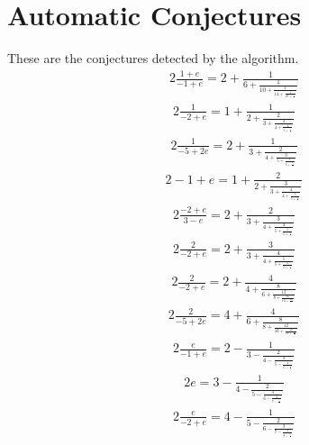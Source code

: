 \documentclass{article}%
\begin{document}
%
\normalsize%
\section{Automatic Conjectures}%
\label{sec:AutomaticConjectures}%
These are the conjectures detected by the algorithm.%
\begin{alignat*}{2}%
\frac{1 + e}{-1 + e} = 2 + \frac{1}{6 + \frac{1}{10 + \frac{1}{14 + \frac{1}{18 + \frac{1}{..}}}}}%
\end{alignat*}%
\begin{alignat*}{2}%
\frac{1}{-2 + e} = 1 + \frac{1}{2 + \frac{2}{3 + \frac{3}{4 + \frac{4}{5 + \frac{5}{..}}}}}%
\end{alignat*}%
\begin{alignat*}{2}%
\frac{1}{-5 + 2 e} = 2 + \frac{1}{3 + \frac{2}{4 + \frac{3}{5 + \frac{4}{6 + \frac{5}{..}}}}}%
\end{alignat*}%
\begin{alignat*}{2}%
-1 + e = 1 + \frac{2}{2 + \frac{3}{3 + \frac{4}{4 + \frac{5}{5 + \frac{6}{..}}}}}%
\end{alignat*}%
\begin{alignat*}{2}%
\frac{-2 + e}{3 - e} = 2 + \frac{2}{3 + \frac{3}{4 + \frac{4}{5 + \frac{5}{6 + \frac{6}{..}}}}}%
\end{alignat*}%
\begin{alignat*}{2}%
\frac{2}{-2 + e} = 2 + \frac{3}{3 + \frac{4}{4 + \frac{5}{5 + \frac{6}{6 + \frac{7}{..}}}}}%
\end{alignat*}%
\begin{alignat*}{2}%
\frac{2}{-2 + e} = 2 + \frac{4}{4 + \frac{8}{6 + \frac{12}{8 + \frac{16}{10 + \frac{20}{..}}}}}%
\end{alignat*}%
\begin{alignat*}{2}%
\frac{2}{-5 + 2 e} = 4 + \frac{4}{6 + \frac{8}{8 + \frac{12}{10 + \frac{16}{12 + \frac{20}{..}}}}}%
\end{alignat*}%
\begin{alignat*}{2}%
\frac{e}{-1 + e} = 2 - \frac{1}{3 - \frac{2}{4 - \frac{3}{5 - \frac{4}{6 - \frac{5}{..}}}}}%
\end{alignat*}%
\begin{alignat*}{2}%
e = 3 - \frac{1}{4 - \frac{2}{5 - \frac{3}{6 - \frac{4}{7 - \frac{5}{..}}}}}%
\end{alignat*}%
\begin{alignat*}{2}%
\frac{e}{-2 + e} = 4 - \frac{1}{5 - \frac{2}{6 - \frac{3}{7 - \frac{4}{8 - \frac{5}{..}}}}}%
\end{alignat*}%
\end{document}
